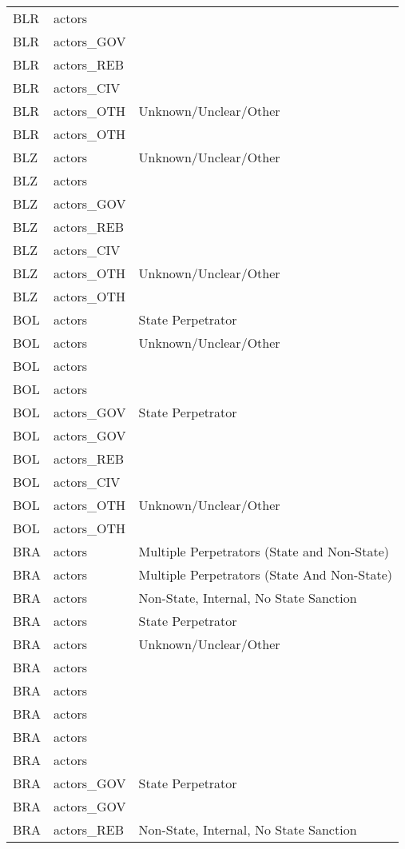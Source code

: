 \begin{table}[ht]
\begin{tabular}{lll}
  BLR & actors &  \\ 
  BLR & actors\_GOV &  \\ 
  BLR & actors\_REB &  \\ 
  BLR & actors\_CIV &  \\ 
  BLR & actors\_OTH & Unknown/Unclear/Other \\ 
  BLR & actors\_OTH &  \\ 
  BLZ & actors & Unknown/Unclear/Other \\ 
  BLZ & actors &  \\ 
  BLZ & actors\_GOV &  \\ 
  BLZ & actors\_REB &  \\ 
  BLZ & actors\_CIV &  \\ 
  BLZ & actors\_OTH & Unknown/Unclear/Other \\ 
  BLZ & actors\_OTH &  \\ 
  BOL & actors & State Perpetrator \\ 
  BOL & actors & Unknown/Unclear/Other \\ 
  BOL & actors &  \\ 
  BOL & actors &  \\ 
  BOL & actors\_GOV & State Perpetrator \\ 
  BOL & actors\_GOV &  \\ 
  BOL & actors\_REB &  \\ 
  BOL & actors\_CIV &  \\ 
  BOL & actors\_OTH & Unknown/Unclear/Other \\ 
  BOL & actors\_OTH &  \\ 
  BRA & actors & Multiple Perpetrators (State and Non-State) \\ 
  BRA & actors & Multiple Perpetrators (State And Non-State) \\ 
  BRA & actors & Non-State, Internal, No State Sanction \\ 
  BRA & actors & State Perpetrator \\ 
  BRA & actors & Unknown/Unclear/Other \\ 
  BRA & actors &  \\ 
  BRA & actors &  \\ 
  BRA & actors &  \\ 
  BRA & actors &  \\ 
  BRA & actors &  \\ 
  BRA & actors\_GOV & State Perpetrator \\ 
  BRA & actors\_GOV &  \\ 
  BRA & actors\_REB & Non-State, Internal, No State Sanction \\ 

\end{tabular}
\end{table}
